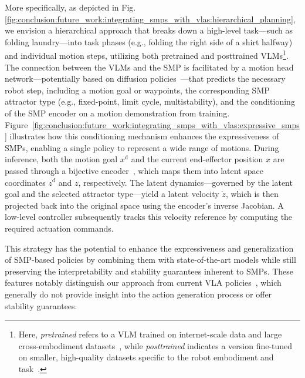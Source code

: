More specifically, as depicted in Fig.\ref{fig:conclusion:future_work:integrating_smps_with_vlas:hierarchical_planning}, we envision a hierarchical approach\citep{haresh2024clevrskills} that breaks down a high-level task—such as folding laundry—into task phases (e.g., folding the right side of a shirt halfway) and individual motion steps, utilizing both pretrained and posttrained \glspl{VLM}\footnote{Here, \emph{pretrained} refers to a \gls{VLM} trained on internet-scale data and large cross-embodiment datasets~\citep{o2024open, kim2024openvla}, while \emph{posttrained} indicates a version fine-tuned on smaller, high-quality datasets specific to the robot embodiment and task~\citep{black2024pi0}.}. The connection between the \glspl{VLM} and the \gls{SMP} is facilitated by a motion head network—potentially based on diffusion policies~\citep{chi2023diffusion}—that predicts the necessary robot step, including a motion goal or waypoints, the corresponding \gls{SMP} attractor type (e.g., fixed-point, limit cycle, multistability), and the conditioning of the \gls{SMP} encoder on a motion demonstration from training. Figure~\ref{fig:conclusion:future_work:integrating_smps_with_vlas:expressive_smps} illustrates how this conditioning mechanism enhances the expressiveness of \glspl{SMP}, enabling a single policy to represent a wide range of motions. During inference, both the motion goal $x^\mathrm{d}$ and the current end-effector position $x$ are passed through a bijective encoder~\citep{rana2020euclideanizing}, which maps them into latent space coordinates $z^\mathrm{d}$ and $z$, respectively. The latent dynamics—governed by the latent goal and the selected attractor type—yield a latent velocity $\dot{z}$, which is then projected back into the original space using the encoder’s inverse Jacobian. A low-level controller subsequently tracks this velocity reference by computing the required actuation commands.

This strategy has the potential to enhance the expressiveness and generalization of \gls{SMP}-based policies by combining them with state-of-the-art models while still preserving the interpretability and stability guarantees inherent to \glspl{SMP}. These features notably distinguish our approach from current \gls{VLA} policies~\citep{black2024pi0}, which generally do not provide insight into the action generation process or offer stability guarantees.